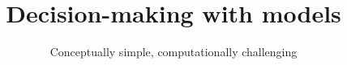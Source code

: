 \title{Decision-making with models}
\subtitle{Conceptually simple, computationally challenging}\vspace{-0.3cm}

\author{}
\date{}
